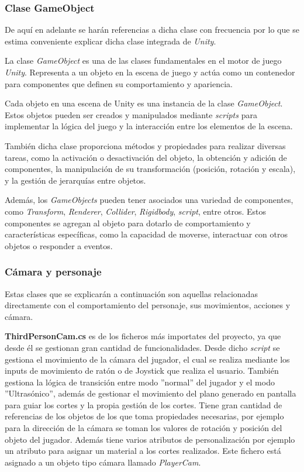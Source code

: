 \subsubsection{Clase GameObject}

De aquí en adelante se harán referencias a dicha clase con frecuencia por lo que se estima conveniente explicar dicha clase integrada de \textit{Unity}.

La clase \textit{GameObject} es una de las clases fundamentales en el motor de juego \textit{Unity}. Representa a un objeto en la escena de juego y actúa como un contenedor para componentes que definen su comportamiento y apariencia.

Cada objeto en una escena de Unity es una instancia de la clase \textit{GameObject}. Estos objetos pueden ser creados y manipulados mediante \textit{scripts} para implementar la lógica del juego y la interacción entre los elementos de la escena.

También dicha clase proporciona métodos y propiedades para realizar diversas tareas, como la activación o desactivación del objeto, la obtención y adición de componentes, la manipulación de su transformación (posición, rotación y escala), y la gestión de jerarquías entre objetos.

Además, los \textit{GameObjects} pueden tener asociados una variedad de componentes, como \textit{Transform}, \textit{Renderer}, \textit{Collider}, \textit{Rigidbody}, \textit{script}, entre otros. Estos componentes se agregan al objeto para dotarlo de comportamiento y características específicas, como la capacidad de moverse, interactuar con otros objetos o responder a eventos.

\subsubsection{Cámara y personaje}

Estas clases que se explicarán a continuación son aquellas relacionadas directamente con el comportamiento del personaje, sus movimientos, acciones y cámara.

\textbf{ThirdPersonCam.cs} es de los ficheros más importates del proyecto, ya que desde él se gestionan gran cantidad de funcionalidades. Desde dicho \textit{script} se gestiona el movimiento de la cámara del jugador, el cual se realiza mediante los inputs de movimiento de ratón o de Joystick que realiza el usuario. También gestiona la lógica de transición entre modo ''normal'' del jugador y el modo ''Ultrasónico'', además de gestionar el movimiento del plano generado en pantalla para guiar los cortes y la propia gestión de los cortes. Tiene gran cantidad de referencias de los objetos de los que toma propiedades necesarias, por ejemplo para la dirección de la cámara se toman los valores de rotación y posición del objeto del jugador. Además tiene varios atributos de personalización por ejemplo un atributo para asignar un material a los cortes realizados. Este fichero está asignado a un objeto tipo cámara llamado \textit{PlayerCam}.

